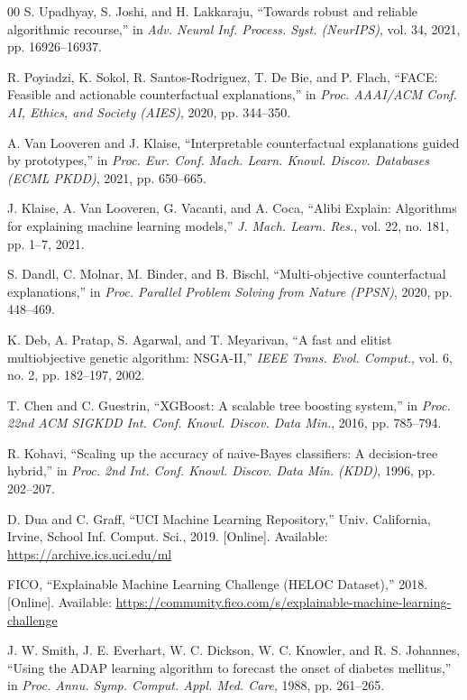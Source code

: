 \documentclass[nolineno]{paper/ieee-access/ieeeaccess}%
\begin{document}
\begin{thebibliography}{00}
S. Upadhyay, S. Joshi, and H. Lakkaraju,
``Towards robust and reliable algorithmic recourse,''
in \emph{Adv. Neural Inf. Process. Syst. (NeurIPS)}, vol. 34, 2021, pp. 16926--16937.

R. Poyiadzi, K. Sokol, R. Santos-Rodriguez, T. De Bie, and P. Flach,
``{FACE}: Feasible and actionable counterfactual explanations,''
in \emph{Proc. AAAI/ACM Conf. AI, Ethics, and Society (AIES)}, 2020, pp. 344--350.

A. Van Looveren and J. Klaise,
``Interpretable counterfactual explanations guided by prototypes,''
in \emph{Proc. Eur. Conf. Mach. Learn. Knowl. Discov. Databases (ECML PKDD)}, 2021, pp. 650--665.

J. Klaise, A. Van Looveren, G. Vacanti, and A. Coca,
``Alibi Explain: Algorithms for explaining machine learning models,''
\emph{J. Mach. Learn. Res.}, vol. 22, no. 181, pp. 1--7, 2021.

S. Dandl, C. Molnar, M. Binder, and B. Bischl,
``Multi-objective counterfactual explanations,''
in \emph{Proc. Parallel Problem Solving from Nature (PPSN)}, 2020, pp. 448--469.

K. Deb, A. Pratap, S. Agarwal, and T. Meyarivan,
``A fast and elitist multiobjective genetic algorithm: {NSGA-II},''
\emph{IEEE Trans. Evol. Comput.}, vol. 6, no. 2, pp. 182--197, 2002.

T. Chen and C. Guestrin,
``{XGBoost}: A scalable tree boosting system,''
in \emph{Proc. 22nd ACM SIGKDD Int. Conf. Knowl. Discov. Data Min.}, 2016, pp. 785--794.

R. Kohavi,
``Scaling up the accuracy of naive-{B}ayes classifiers: A decision-tree hybrid,''
in \emph{Proc. 2nd Int. Conf. Knowl. Discov. Data Min. (KDD)}, 1996, pp. 202--207.

D. Dua and C. Graff,
``{UCI} Machine Learning Repository,''
Univ. California, Irvine, School Inf. Comput. Sci., 2019. [Online]. Available: \url{https://archive.ics.uci.edu/ml}

{FICO},
``Explainable Machine Learning Challenge ({HELOC} Dataset),''
2018. [Online]. Available: \url{https://community.fico.com/s/explainable-machine-learning-challenge}

J. W. Smith, J. E. Everhart, W. C. Dickson, W. C. Knowler, and R. S. Johannes,
``Using the {ADAP} learning algorithm to forecast the onset of diabetes mellitus,''
in \emph{Proc. Annu. Symp. Comput. Appl. Med. Care}, 1988, pp. 261--265.
\end{thebibliography}
\end{document}
